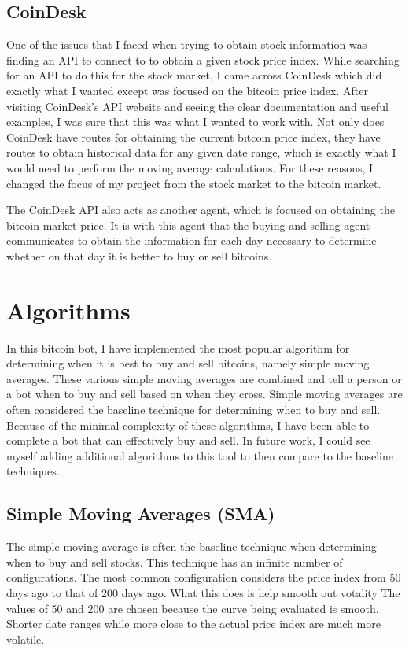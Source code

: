 \subsection{CoinDesk}

One of the issues that I faced when trying to obtain stock information was finding
an API to connect to to obtain a given stock price index. While searching for an API to do this for
the stock market, I came across CoinDesk which did exactly what I wanted except was focused on the
bitcoin price index. After visiting CoinDesk's API website and seeing the clear documentation and
useful examples, I was sure that this was what I wanted to work with. Not only does CoinDesk have
routes for obtaining the current bitcoin price index, they have routes to obtain historical data
for any given date range, which is exactly what I would need to perform the moving average calculations.
For these reasons, I changed the focus of my project from the stock market to the bitcoin market.

The CoinDesk API also acts as another agent, which is focused on obtaining the bitcoin market price.
It is with this agent that the buying and selling agent communicates to obtain the information for each
day necessary to determine whether on that day it is better to buy or sell bitcoins.

\section{Algorithms}

In this bitcoin bot, I have implemented the most popular algorithm for determining when it is best
to buy and sell bitcoins, namely simple moving averages. These various simple moving averages are combined
and tell a person or a bot when to buy and sell based on when they cross. Simple moving averages are
often considered the baseline technique for determining when to buy and sell. Because of the minimal
complexity of these algorithms, I have been able to complete a bot that can effectively buy and sell.
In future work, I could see myself adding additional algorithms to this tool to then compare to the
baseline techniques.

\subsection{Simple Moving Averages (SMA)}

The simple moving average is often the baseline technique when determining when to buy and sell stocks.
This technique has an infinite number of configurations. The most common configuration considers
the price index from 50 days ago to that of 200 days ago. What this does is help smooth out votality
The values of 50 and 200 are chosen because the curve being evaluated is smooth. Shorter date ranges
while more close to the actual price index are much more volatile.

